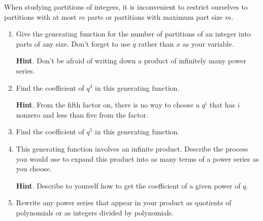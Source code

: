 \documentclass{book}
\begin{document}
\setcounter{cpjt}{319}
\addtocounter{cpjt}{-1}
\begin{activity}\label{genfunpartitions}
\hypertarget{p-1577}{}%
When studying partitions of integers, it is inconvenient to restrict ourselves to partitions with at most \(m\) parts or partitions with maximum part size \(m\).%
\begin{enumerate}[font=\bfseries,label=(\alph*),ref=\alph*]
\item\label{task-271} \hypertarget{p-1578}{}%
Give the generating function for the number of partitions of an integer into parts of any size. Don't forget to use \(q\) rather than \(x\) as your variable.%
\par\smallskip%
\noindent\textbf{Hint}.\hypertarget{hint-208}{}\quad%
\hypertarget{p-1579}{}%
Don't be afraid of writing down a product of infinitely many power series.%
\par\smallskip%
\noindent\item\label{task-272} \hypertarget{p-1581}{}%
Find the coefficient of \(q^4\) in this generating function.%
\par\smallskip%
\noindent\textbf{Hint}.\hypertarget{hint-209}{}\quad%
\hypertarget{p-1582}{}%
From the fifth factor on, there is no way to choose a \(q^i\) that has \(i\) nonzero and less than five from the factor.%
\par\smallskip%
\noindent\item\label{task-273} \hypertarget{p-1584}{}%
Find the coefficient of \(q^5\) in this generating function.%
\par\smallskip%
\noindent\item\label{task-274} \hypertarget{p-1586}{}%
This generating function involves an infinite product. Describe the process you would use to expand this product into as many terms of a power series as you choose.%
\par\smallskip%
\noindent\textbf{Hint}.\hypertarget{hint-210}{}\quad%
\hypertarget{p-1587}{}%
Describe to yourself how to get the coefficient of a given power of \(q\).%
\par\smallskip%
\noindent\item\label{task-275} \hypertarget{p-1589}{}%
Rewrite any power series that appear in your product as quotients of polynomials or as integers divided by polynomials.%
\par\smallskip%
\noindent\end{enumerate}
\end{activity}

\clearpage
\end{document}
